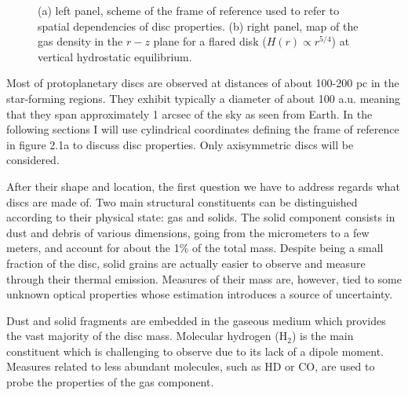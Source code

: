\documentclass[a4paper,10pt]{report}
\begin{document}
\begin{figure}
\begin{center}
{}
    
    \end{center}
    \caption{(a) left panel, scheme of the frame of reference used to refer to
    spatial dependencies of disc properties. (b) right panel, map of the 
    gas density in the $r-z$ plane for a flared disk ($H(r) \propto r^{5/4}$) at vertical hydrostatic equilibrium.
}
\end{figure}

Most of protoplanetary discs are observed at distances of about 100-200 pc in the star-forming regions. 
They exhibit typically a diameter of about 100 a.u. meaning that they span approximately
1 arcsec of the sky as seen from Earth.
In the following sections I will use cylindrical coordinates 
defining the frame of reference in figure 2.1a to discuss disc properties. Only axisymmetric discs will be considered.

After their shape and location, the first question we have to address regards what discs are made of.
Two main structural constituents can be distinguished according to their physical state: gas and solids.
The solid component consists in dust and debris of various dimensions, going from the micrometers to a few 
meters, and account for about the 1\% of the total mass. Despite being a small fraction of the disc, solid grains
are actually easier to observe and measure through their thermal emission. Measures of their mass are, however, tied to
some unknown optical properties whose estimation introduces a source of uncertainty.

Dust and solid fragments are embedded in the gaseous medium which provides the vast majority of the disc mass.
Molecular hydrogen (H$_2$) is the main constituent which is challenging to observe due to
its lack of a dipole moment. 
Measures related to less abundant molecules, such as HD or CO, are used to probe the properties of the gas component. 
\end{document}
